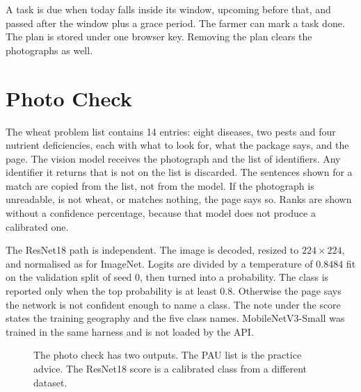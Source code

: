 A task is due when today falls inside its window, upcoming before that, and passed after the window plus a grace period. The farmer can mark a task done. The plan is stored under one browser key. Removing the plan clears the photographs as well.

\section{Photo Check}
The wheat problem list contains 14 entries: eight diseases, two pests and four nutrient deficiencies, each with what to look for, what the package says, and the page. The vision model receives the photograph and the list of identifiers. Any identifier it returns that is not on the list is discarded. The sentences shown for a match are copied from the list, not from the model. If the photograph is unreadable, is not wheat, or matches nothing, the page says so. Ranks are shown without a confidence percentage, because that model does not produce a calibrated one.

The ResNet18 path is independent. The image is decoded, resized to $224 \times 224$, and normalised as for ImageNet. Logits are divided by a temperature of $0.8484$ fit on the validation split of seed 0, then turned into a probability. The class is reported only when the top probability is at least 0.8. Otherwise the page says the network is not confident enough to name a class. The note under the score states the training geography and the five class names. MobileNetV3-Small was trained in the same harness and is not loaded by the API.

\begin{figure}[H]
\centering
{}
\caption{The photo check has two outputs. The PAU list is the practice advice. The ResNet18 score is a calibrated class from a different dataset.}
\label{fig:photopath}
\end{figure}

